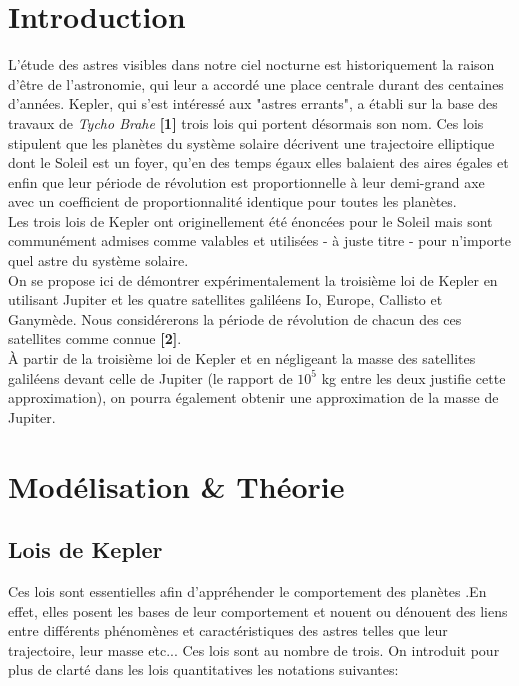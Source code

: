 \documentclass{aa}
\begin{document}
\section{Introduction}
    L'étude des astres visibles dans notre ciel nocturne est historiquement la raison d'être de l'astronomie, qui leur a accordé une place centrale durant des centaines d'années. Kepler, qui s'est intéressé aux "astres errants", a établi sur la base des travaux de \emph{Tycho Brahe} \textbf{[1]} trois lois qui portent désormais son nom. Ces lois stipulent que les planètes du système solaire décrivent une trajectoire elliptique dont le Soleil est un foyer, qu’en des temps égaux elles balaient des aires égales et enfin que leur période de révolution est proportionnelle à leur demi-grand axe avec un coefficient de proportionnalité identique pour toutes les planètes. \\
    Les trois lois de Kepler ont originellement été énoncées pour le Soleil mais sont communément admises comme valables et utilisées - à juste titre - pour n'importe quel astre du système solaire.\\
    On se propose ici de démontrer expérimentalement la troisième loi de Kepler en utilisant Jupiter et les quatre satellites galiléens Io, Europe, Callisto et Ganymède. Nous considérerons la période de révolution de chacun des ces satellites comme connue \textbf{[2]}.\\
    
    À partir de la troisième loi de Kepler et en négligeant la masse des satellites galiléens devant celle de Jupiter (le rapport de $10^5$ kg entre les deux justifie cette approximation), on pourra également obtenir une approximation de la masse de Jupiter.
    
    

\section{Modélisation \& Théorie}



\subsection{Lois de Kepler}
Ces lois sont essentielles afin d'appréhender le comportement des planètes .En effet, elles posent les bases de leur comportement et nouent ou dénouent des liens entre différents phénomènes et caractéristiques des astres telles que leur trajectoire, leur masse etc... Ces lois sont au nombre de trois. On introduit pour plus de clarté dans les lois quantitatives les notations suivantes: \break
\end{document}
